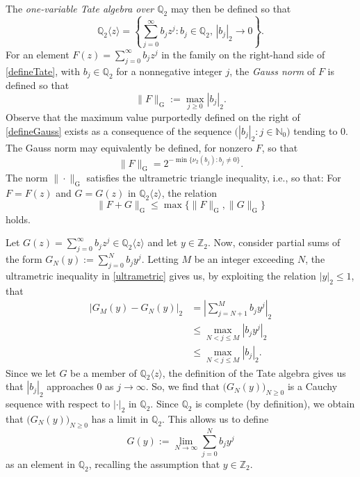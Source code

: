 \documentclass[11pt,letterpaper]{amsart}
\begin{document}
 The \emph{one-variable Tate algebra over $\mathbb{Q}_2$} may then be defined so that 
\begin{equation}\label{defineTate}
 \mathbb{Q}_{2}\langle z \rangle 
 = \left\{ \sum_{j=0}^{\infty} b_{j} z^{j} : b_{j} \in \mathbb{Q}_{2}, \, \left| b_{j} \right|_{2} \to 0 \right\}. 
\end{equation}
 For an element
 $F(z) = \sum_{j=0}^{\infty} b_{j} z^{j}$ in the family on the right-hand side of 
 \eqref{defineTate}, with $b_{j} \in \mathbb{Q}_{2}$ for a nonnegative integer $j$, 
 the \emph{Gauss norm} of $F$ is defined so that 
\begin{equation}\label{defineGauss}
 \| F \|_{\operatorname{G}} := \max_{j \geq 0} \left| b_{j} \right|_{2}. 
\end{equation}
 Observe that the maximum value purportedly defined on the right of \eqref{defineGauss}
 exists as a consequence of the sequence $\big( |b_j|_{2} : j \in \mathbb{N}_{0} \big)$
 tending to $0$. The Gauss norm may equivalently be defined, for nonzero $F$, so that 
\begin{equation}\label{alternativenorm} 
 \| F \|_{\operatorname{G}} = 2^{-\min\{ \nu_2(b_j) : b_j \neq 0 \}}. 
\end{equation}
 The norm $\| \cdot \|_{\operatorname{G}}$
 satisfies the ultrametric triangle inequality, i.e., so that:
 For $F = F(z)$ and $G = G(z)$ in $\mathbb{Q}_{2}\langle z \rangle$, the relation 
\begin{equation}\label{ultrametric}
 \| F + G \|_{\operatorname{G}} \leq \max\{ \| F \|_{\operatorname{G}}, \| G \|_{\operatorname{G}} \} 
\end{equation}
 holds. 

 Let $ G(z) = \sum_{j=0}^{\infty} b_{j} z^{j} \in \mathbb{Q}_{2}\langle z \rangle $
 and let $y \in \mathbb{Z}_{2}$. Now, consider partial sums of the form 
 $ G_{N}(y) := \sum_{j=0}^{N} b_{j} y^{j}$. 
 Letting $M$ be an integer exceeding $N$, 
 the ultrametric inequality in \eqref{ultrametric}
 gives us, by exploiting the relation $|y|_{2} \leq 1$, that 
\begin{align*}
 \left| G_{M}(y) - G_{N}(y) \right|_{2}
 & = \left| \sum_{j = N + 1}^{M} b_{j} y^{j} \right|_{2} \\ 
 & \leq \max_{N < j \leq M} \left| b_{j} y^{j} \right|_{2} \\ 
 & \leq \max_{N < j \leq M} \left| b_{j} \right|_{2}. 
\end{align*}
 Since we let $G$ be a member of $\mathbb{Q}_{2}\langle z \rangle$, 
 the definition of the Tate algebra gives us that $|b_{j}|_{2}$ approaches $0$ as $j \to \infty$. 
 So, we find that $\big( G_{N}(y) \big)_{N \geq 0}$ 
 is a Cauchy sequence	 with respect to $| \cdot |_{2}$ in $\mathbb{Q}_{2}$. 
 Since $\mathbb{Q}_{2}$ is complete (by definition), 
 we obtain that $\big( G_{N}(y) \big)_{N \geq 0}$ has a limit 
 in $\mathbb{Q}_{2}$. This allows us to define
\begin{equation}\label{defineGy} 
 G(y) := \lim_{N \to \infty} \sum_{j=0}^{N} b_{j} y^{j} 
\end{equation}
 as an element in $\mathbb{Q}_{2}$, recalling the assumption that $y \in \mathbb{Z}_{2}$. 
\end{document}
